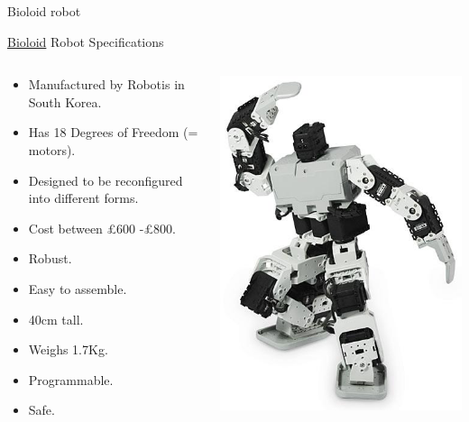 \documentclass[compress]{beamer}
\begin{document}
\begin{frame}{Bioloid robot}

    \href{http://www.robotis.com/xe/bioloid_en}{Bioloid} Robot
    Specifications

    \begin{columns}
        \begin{column}{0.5\linewidth}
    \begin{itemize}

        \item Manufactured by Robotis in South Korea.
        \item Has 18 Degrees of Freedom (= motors).
        \item Designed to be reconfigured into different forms.
        \item Cost between £600 -£800.
        \item Robust.
        \item Easy to assemble.
        \item 40cm tall.
        \item Weighs 1.7Kg.
        \item Programmable.
        \item Safe.
    \end{itemize}
            
        \end{column}
        \begin{column}{0.5\linewidth}
            \begin{center}
                \includegraphics[width=0.8\linewidth]{image24}
            \end{center}
        \end{column}
    \end{columns}

\end{frame}
\end{document}
